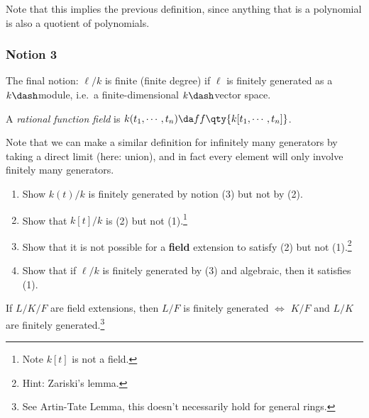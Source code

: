 Note that this implies the previous definition, since anything that is a
polynomial is also a quotient of polynomials.

\hypertarget{notion-3}{%
\subsubsection{Notion 3}\label{notion-3}}

The final notion: \(\ell/k\) is finite (finite degree) if \(\ell\) is
finitely generated as a \(k\dash\)module, i.e.~a finite-dimensional
\(k\dash\)vector space.

\begin{definition}

A \emph{rational function field} is
\(k(t_1, \cdots, t_n) \da ff \qty{ k[t_1, \cdots, t_n]}\).

\end{definition}

Note that we can make a similar definition for infinitely many
generators by taking a direct limit (here: union), and in fact every
element will only involve finitely many generators.

\begin{exercise}

\envlist

\begin{enumerate}
\def\labelenumi{\alph{enumi}.}
\item
  Show \(k(t) / k\) is finitely generated by notion (3) but not by (2).
\item
  Show that \(k[t]/k\) is (2) but not (1).\footnote{Note \(k[t]\) is not
    a field.}
\item
  Show that it is not possible for a \textbf{field} extension to satisfy
  (2) but not (1).\footnote{Hint: Zariski's lemma.}
\item
  Show that if \(\ell/k\) is finitely generated by (3) and algebraic,
  then it satisfies (1).
\end{enumerate}

\end{exercise}

\begin{theorem}

If \(L/K/F\) are field extensions, then \(L/F\) is finitely generated
\(\iff\) \(K/F\) and \(L/K\) are finitely generated.\footnote{See
  Artin-Tate Lemma, this doesn't necessarily hold for general rings.}

\end{theorem}

